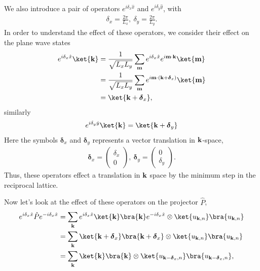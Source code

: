 We also introduce a pair of operators $e^{i \delta_x \hat x}$ and $e^{i \delta_y \hat y}$, 
with
\begin{align}
\delta_x = \frac{2\pi}{L_x} ,\  \delta_y = \frac{2\pi}{L_y}.
\end{align}
In order to understand the effect of these operators, we consider their effect on the plane wave states
\begin{align}
	e^{i \delta_x \hat x}\ket{\textbf k} &= \frac{1}{\sqrt{L_x L_y}} \sum_{\textbf m} e^{i \delta_x \hat x} e^{i \textbf m \cdot \textbf k} \ket {\textbf m} \\
	& = \frac{1}{\sqrt{L_x L_y}} \sum_{\textbf m} e^{i \textbf m \cdot (\textbf k + \boldsymbol{\delta}_x)} \ket {\textbf m}\\
	& = \ket{\textbf k + \boldsymbol \delta_x},
\end{align}
similarly
\begin{align}
	e^{i \delta_y \hat y}\ket{\textbf k} = \ket{\textbf k + \boldsymbol \delta_y } 
\end{align}
Here the symbols $\boldsymbol{\delta}_x$ and $\boldsymbol{\delta}_y$ represents a vector translation in $\textbf k$-space,
\begin{align}
	\boldsymbol \delta_x = \begin{pmatrix}
	\delta_x \\
	0
	\end{pmatrix}, \ \boldsymbol \delta_y = \begin{pmatrix}
	0 \\
	\delta_y
	\end{pmatrix}.
\end{align}
Thus, these operators effect a translation in $\textbf k$ space by the minimum step in the reciprocal lattice. \par
Now let's look at the effect of these operators on the projector $\hat P$,
\begin{align}
	e^{i \delta_x \hat x} \hat P e^{-i \delta_x \hat x}  &=  \sum_{\textbf k} e^{i \delta_x \hat x}  \ket{\textbf k} \bra{\textbf k} e^{-i \delta_x \hat x}\otimes \ket{u_{\textbf k, n}}\bra{u_{\textbf k, n}} \\
	&=  \sum_{\textbf k} \ket{\textbf k +\boldsymbol{\delta}_x} \bra{\textbf k +\boldsymbol{\delta}_x } \otimes \ket{u_{\textbf k, n}}\bra{u_{\textbf k, n}} \\
	&=  \sum_{\textbf k} \ket{\textbf k } \bra{\textbf k } \otimes \ket{u_{\textbf k-\boldsymbol{\delta}_x, n}}\bra{u_{\textbf k-\boldsymbol{\delta}_x , n}},
\end{align}

